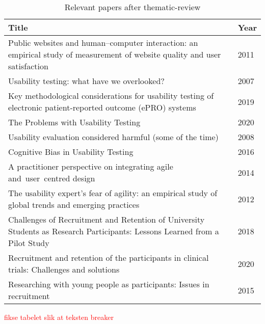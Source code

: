 \begin{table}[H]
\begin{tabular}{ll}
\hline
\textbf{Title} & \textbf{Year} \\ \hline
Public websites and human–computer interaction: an empirical study of measurement of website quality and user satisfaction & 2011 \\
Usability testing: what have we overlooked? & 2007 \\
Key methodological considerations for usability testing of electronic patient-reported outcome (ePRO) systems & 2019 \\
The Problems with Usability Testing & 2020 \\
Usability evaluation considered harmful (some of the time) & 2008 \\
Cognitive Bias in Usability Testing & 2016 \\
A practitioner perspective on integrating agile and user centred design & 2014 \\
The usability expert's fear of agility: an empirical study of global trends and emerging practices & 2012 \\
Challenges of Recruitment and Retention of University Students as Research Participants: Lessons Learned from a Pilot Study & 2018 \\
Recruitment and retention of the participants in clinical trials: Challenges and solutions & 2020 \\
Researching with young people as participants: Issues in recruitment & 2015 \\ \hline
\end{tabular}
\caption{Relevant papers after thematic-review}
\label{tab:relevant-papers}
\end{table}

\textcolor{red}{fikse tabelet slik at teksten breaker}


